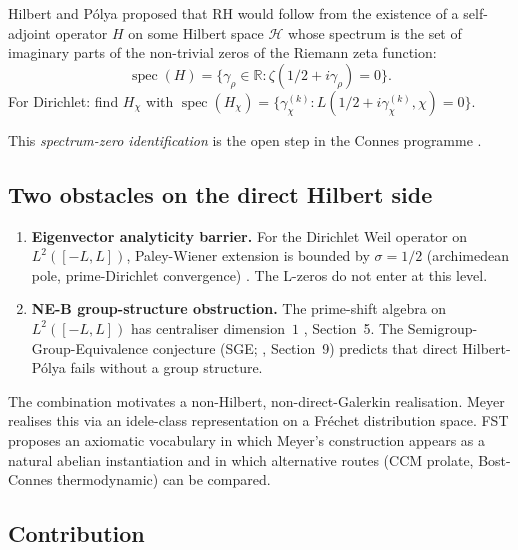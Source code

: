 \documentclass[11pt,a4paper]{article}
\theoremstyle{plain}
\theoremstyle{definition}
\DeclareMathOperator{\spec}{spec}
\newcommand{\R}{\mathbb{R}}
\newcommand{\HH}{\mathcal{H}}
\newcommand{\chifn}{\chi}
\begin{document}
Hilbert and P\'olya proposed that RH would follow from the
existence of a self-adjoint operator $H$ on some Hilbert space
$\HH$ whose spectrum is the set of imaginary parts of the
non-trivial zeros of the Riemann zeta function:
\begin{equation}
  \spec(H) = \{\gamma_\rho \in \R : \zeta(1/2 + i\gamma_\rho) = 0\}.
\end{equation}
For Dirichlet: find $H_\chifn$ with $\spec(H_\chifn) =
\{\gamma_\chifn^{(k)} : L(1/2 + i\gamma_\chifn^{(k)}, \chifn) = 0\}$.

This \emph{spectrum-zero identification} is the open step in the
Connes programme
\cite{Connes1999,Connes2026,ConnesConsaniMoscovici2025}.

\subsection{Two obstacles on the direct Hilbert side}

\begin{enumerate}[leftmargin=*]
  \item \textbf{Eigenvector analyticity barrier.}  For the Dirichlet
    Weil operator on $L^2([-L,L])$, Paley-Wiener extension is bounded
    by $\sigma = 1/2$ (archimedean pole, prime-Dirichlet convergence)
    \cite{AnalyticKernelV2,C2LayerStatus}.  The L-zeros do not
    enter at this level.
  \item \textbf{NE-B group-structure obstruction.}  The prime-shift
    algebra on $L^2([-L,L])$ has centraliser dimension~$1$
    \cite{Geiger2026RHII}, Section~5.  The Semigroup-Group-Equivalence
    conjecture (SGE; \cite{MathMaster}, Section~9) predicts that direct
    Hilbert-P\'olya fails without a group structure.
\end{enumerate}

The combination motivates a non-Hilbert, non-direct-Galerkin
realisation.  Meyer \cite{Meyer2005} realises this via an idele-class
representation on a Fr\'echet distribution space.  FST proposes an
axiomatic vocabulary in which Meyer's construction appears as a
natural abelian instantiation and in which alternative routes (CCM
prolate, Bost-Connes thermodynamic) can be compared.

\subsection{Contribution}
\end{document}
